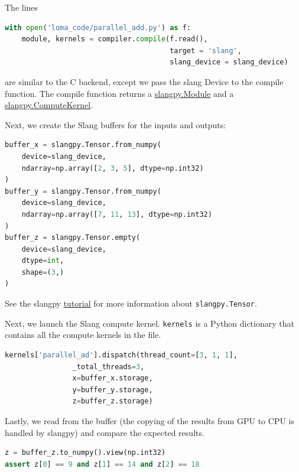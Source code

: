 The lines 
\begin{lstlisting}[language=python]
with open('loma_code/parallel_add.py') as f:
    module, kernels = compiler.compile(f.read(),
                                       target = 'slang',
                                       slang_device = slang_device)
\end{lstlisting}
are similar to the C backend, except we pass the slang Device to the compile function. The compile function returns a \href{https://slangpy.shader-slang.org/en/latest/src/api_reference.html#slangpy.Module}{slangpy.Module} and a \href{https://slangpy.shader-slang.org/en/latest/src/api_reference.html#slangpy.ComputeKernel}{slangpy.ComputeKernel}.

Next, we create the Slang buffers for the inputs and outputs:
\begin{lstlisting}[language=python]
buffer_x = slangpy.Tensor.from_numpy(
    device=slang_device,
    ndarray=np.array([2, 3, 5], dtype=np.int32)
)
buffer_y = slangpy.Tensor.from_numpy(
    device=slang_device,
    ndarray=np.array([7, 11, 13], dtype=np.int32)
)
buffer_z = slangpy.Tensor.empty(
    device=slang_device,
    dtype=int,
    shape=(3,)
)
\end{lstlisting}
See the slangpy \href{https://slangpy.shader-slang.org/en/latest/src/tensors/python.html}{tutorial} for more information about \lstinline{slangpy.Tensor}.

Next, we launch the Slang compute kernel. \lstinline{kernels} is a Python dictionary that contains all the compute kernels in the file.
\begin{lstlisting}[language=python]
kernels['parallel_ad'].dispatch(thread_count=[3, 1, 1],
                _total_threads=3,
                x=buffer_x.storage,
                y=buffer_y.storage,
                z=buffer_z.storage)
\end{lstlisting}

Lastly, we read from the buffer (the copying of the results from GPU to CPU is handled by slangpy) and compare the expected results.
\begin{lstlisting}[language=python]
z = buffer_z.to_numpy().view(np.int32)
assert z[0] == 9 and z[1] == 14 and z[2] == 18
\end{lstlisting}

